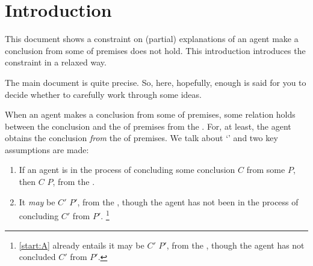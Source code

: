 \chapter{Introduction}
\label{cha:introduction}


\begin{note}
  This document shows a constraint on (partial) explanations of  an agent make a conclusion from some \pool{} of premises does not hold.
  This introduction introduces the constraint in a relaxed way.

  The main document is quite precise.
  So, here, hopefully, enough is said for you to decide whether to carefully work through some ideas.
\end{note}


\begin{note}
  When an agent makes a conclusion from some \pool{} of premises, some relation holds between the conclusion and the \pool{} of premises from the \agpe{}.
  For, at least, the agent obtains the conclusion \emph{from} the \pool{} of premises.
  We talk about `' and two key assumptions are made:
  \begin{enumerate}[label=\Alph*., ref=(\Alph*)]
  \item
    \label{start:A}
    If an agent is in the process of concluding some conclusion \(C\) from some \pool{} \(P\), then \(C\) \fof{} \(P\), from the \agpe{}.
  \item
    \label{start:B}
    It \emph{may} be \(C'\) \fof{} \(P'\), from the \agpe{}, though the agent has not been in the process of concluding \(C'\) from \(P'\).%
    \footnote{
      \ref{start:A} already entails it may be \(C'\) \fof{} \(P'\), from the \agpe{}, though the agent has not concluded \(C'\) from \(P'\).
    }
  \end{enumerate}
\end{note}

